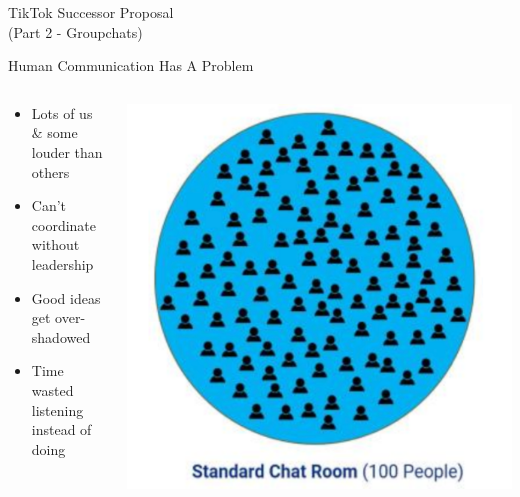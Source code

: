 \documentclass[aspectratio=169]{beamer}
\begin{document}
\begin{frame}
    \centering
    \Huge TikTok Successor Proposal \\
    \Huge (Part 2 - Groupchats)
\end{frame}

\begin{frame}{Human Communication Has A Problem}
\begin{columns}[T]
    \begin{column}[T]{0.5\textwidth}
        \begin{itemize}
            \item Lots of us \& some louder than others
            \item Can't coordinate without leadership
            \item Good ideas get over-shadowed
            \item Time wasted listening instead of doing
        \end{itemize}
    \end{column}
    \begin{column}{0.5\textwidth}
        \includegraphics[height=0.8\textheight]{imgs/CSI_section/standard_chat_room.png}
    \end{column}
\end{columns}
\end{frame}
\end{document}

